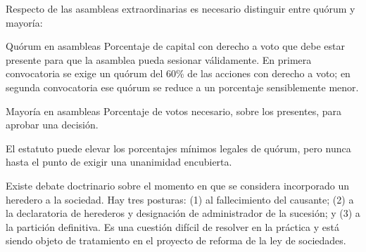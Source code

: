 \documentclass[12pt,oneside]{book}
\begin{document}
Respecto de las asambleas extraordinarias es necesario distinguir entre quórum y mayoría:

\begin{definition}{Quórum en asambleas}
Porcentaje de capital con derecho a voto que debe estar presente para que la asamblea pueda sesionar válidamente. En primera convocatoria se exige un quórum del 60\% de las acciones con derecho a voto; en segunda convocatoria ese quórum se reduce a un porcentaje sensiblemente menor.
\end{definition}

\begin{definition}{Mayoría en asambleas}
Porcentaje de votos necesario, sobre los presentes, para aprobar una decisión.
\end{definition}

\begin{important}
El estatuto puede elevar los porcentajes mínimos legales de quórum, pero nunca hasta el punto de exigir una unanimidad encubierta.
\end{important}

Existe debate doctrinario sobre el momento en que se considera incorporado un heredero a la sociedad. Hay tres posturas: (1) al fallecimiento del causante; (2) a la declaratoria de herederos y designación de administrador de la sucesión; y (3) a la partición definitiva. Es una cuestión difícil de resolver en la práctica y está siendo objeto de tratamiento en el proyecto de reforma de la ley de sociedades.
\end{document}
